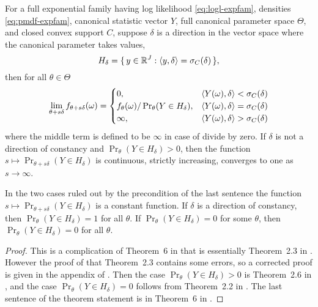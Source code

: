 \begin{theorem} \label{th:completion-fundamental}
For a full exponential family having log likelihood \eqref{eq:logl-expfam},
densities \eqref{eq:pmdf-expfam}, canonical statistic vector $Y$,
full canonical parameter space $\Theta$, and closed convex support $C$,
suppose $\delta$ is a direction in the vector space where the canonical
parameter takes values,
\begin{equation} \label{eq:complete-fundamental-hyperplane}
   H_\delta = \{\,  y \in \mathbb{R}^J : \langle y, \delta \rangle = \sigma_C(\delta)  \,\},
\end{equation}
then for all $\theta \in \Theta$
\begin{equation} \label{eq:complete-fundamental-limit}
   \lim_{\theta + s \delta} f_{\theta + s \delta}(\omega)
   =
   \begin{cases}
   0, & \langle Y(\omega), \delta \rangle < \sigma_C(\delta)
   \\
   f_\theta(\omega) / \Pr_\theta(Y \in H_\delta),
   & \langle Y(\omega), \delta \rangle = \sigma_C(\delta)
   \\
   \infty, & \langle Y(\omega), \delta \rangle > \sigma_C(\delta)
   \end{cases}
\end{equation}
where the middle term is defined to be $\infty$ in case of divide by zero.
If $\delta$ is not a direction of constancy
and $\Pr_\theta(Y \in H_\delta) > 0$, then the function
$s \mapsto \Pr_{\theta + s \delta}(Y \in H_\delta)$ is continuous,
strictly increasing, converges to one
as $s \to \infty$.
\end{theorem}
In the two cases ruled out by the precondition of the last sentence
the function $s \mapsto \Pr_{\theta + s \delta}(Y \in H_\delta)$ is
a constant function.  If $\delta$ is a direction of constancy,
then $\Pr_\theta(Y \in H_\delta) = 1$ for all $\theta$.
If $\Pr_\theta(Y \in H_\delta) = 0$ for some $\theta$,
then $\Pr_\theta(Y \in H_\delta) = 0$ for all $\theta$.
\begin{proof}
This is a complication of Theorem~{6} in \citet{geyer-gdor}
that is essentially Theorem~{2.3} in \citet{geyer-thesis}.
However the proof of that Theorem~{2.3} contains some errors,
so a corrected proof is given in the appendix of \citet{geyer-gdor}.
Then the case $\Pr_\theta(Y \in H_\delta) > 0$ is Theorem~{2.6}
in \citet{geyer-thesis},
and the case $\Pr_\theta(Y \in H_\delta) = 0$ follows from Theorem~{2.2}
in \citet{geyer-thesis}.
The last sentence of the theorem statement is in Theorem~{6}
in \citet{geyer-gdor}.
\end{proof}
